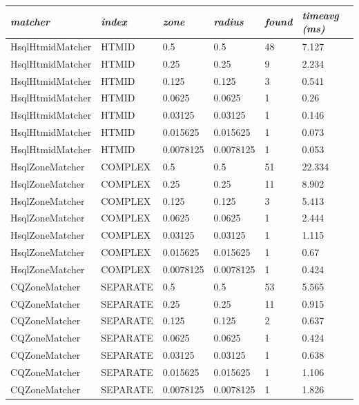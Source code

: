 \documentclass{article}
\begin{document}
\begin{table}[hbt!]
\centering
\begin{tabular}{|l|l|l|l|l|l|}
\hline
\textit{matcher} & \textit{index} & \textit{zone} & \textit{radius} & \textit{found} & \textit{timeavg (ms)} \\ \hline
HsqlHtmidMatcher & HTMID     & 0.5       & 0.5       & 48 &  7.127 \\ \hline
HsqlHtmidMatcher & HTMID     & 0.25      & 0.25      &  9 &  2.234 \\ \hline
HsqlHtmidMatcher & HTMID     & 0.125     & 0.125     &  3 &  0.541 \\ \hline
HsqlHtmidMatcher & HTMID     & 0.0625    & 0.0625    &  1 &  0.26 \\ \hline
HsqlHtmidMatcher & HTMID     & 0.03125   & 0.03125   &  1 &  0.146 \\ \hline
HsqlHtmidMatcher & HTMID     & 0.015625  & 0.015625  &  1 &  0.073 \\ \hline
HsqlHtmidMatcher & HTMID     & 0.0078125 & 0.0078125 &  1 &  0.053 \\ \hline
HsqlZoneMatcher  & COMPLEX   & 0.5       & 0.5       & 51 & 22.334 \\ \hline
HsqlZoneMatcher  & COMPLEX   & 0.25      & 0.25      & 11 &  8.902 \\ \hline
HsqlZoneMatcher  & COMPLEX   & 0.125     & 0.125     &  3 &  5.413 \\ \hline
HsqlZoneMatcher	 & COMPLEX   & 0.0625    & 0.0625    &  1 &  2.444 \\ \hline
HsqlZoneMatcher	 & COMPLEX   & 0.03125   & 0.03125   &  1 &  1.115 \\ \hline
HsqlZoneMatcher	 & COMPLEX   & 0.015625  & 0.015625  &  1 &  0.67 \\ \hline
HsqlZoneMatcher	 & COMPLEX   & 0.0078125 & 0.0078125 &  1 &  0.424 \\ \hline
CQZoneMatcher	 & SEPARATE  & 0.5       & 0.5       & 53 &  5.565 \\ \hline
CQZoneMatcher	 & SEPARATE  & 0.25      & 0.25      & 11 &  0.915 \\ \hline
CQZoneMatcher	 & SEPARATE  & 0.125     & 0.125     &  2 &  0.637 \\ \hline
CQZoneMatcher	 & SEPARATE  & 0.0625    & 0.0625    &  1 &  0.424 \\ \hline
CQZoneMatcher	 & SEPARATE  & 0.03125   & 0.03125   &  1 &  0.638 \\ \hline
CQZoneMatcher	 & SEPARATE  & 0.015625  & 0.015625  &  1 &  1.106 \\ \hline
CQZoneMatcher	 & SEPARATE  & 0.0078125 & 0.0078125 &  1 &  1.826 \\ \hline
\end{tabular}
\end{table}
\end{document}
